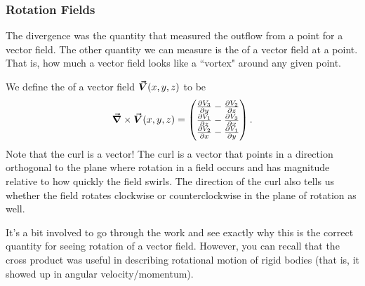 		        \subsubsection{Rotation Fields}
		        The divergence was the quantity that measured the outflow from a point for a vector field.  The other quantity we can measure is the  of a vector field at a point. That is, how much a vector field looks like a ``vortex" around any given point.
		        
		        We define the  of a vector field $\boldsymbol{\vec{V}}(x,y,z)$ to be
		        \[
		        \boldsymbol{\vec{\nabla}} \times \boldsymbol{\vec{V}}(x,y,z) = \begin{pmatrix} \frac{\partial V_3}{\partial y} - \frac{\partial V_2}{\partial z} \\ \frac{\partial V_1}{\partial z} - \frac{\partial V_3}{\partial x} \\ \frac{\partial V_2}{\partial x} - \frac{\partial V_1}{\partial y} \end{pmatrix}.
		        \]
		        Note that the curl is a vector! The curl is a vector that points in a direction orthogonal to the plane where rotation in a field occurs and has magnitude relative to how quickly the field swirls. The direction of the curl also tells us whether the field rotates clockwise or counterclockwise in the plane of rotation as well.
		        
		        It's a bit involved to go through the work and see exactly why this is the correct quantity for seeing rotation of a vector field.  However, you can recall that the cross product was useful in describing rotational motion of rigid bodies (that is, it showed up in angular velocity/momentum).
		        
